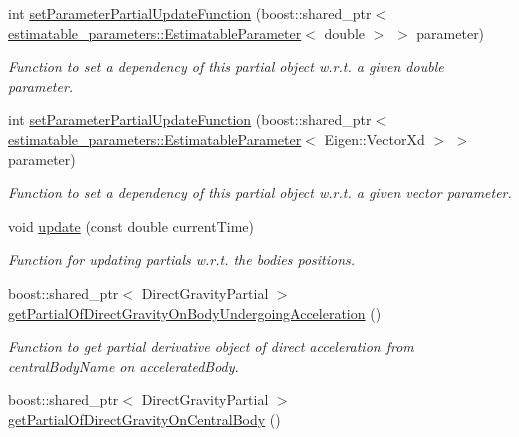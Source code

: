 \begin{DoxyCompactItemize}
int \hyperlink{classtudat_1_1acceleration__partials_1_1ThirdBodyGravityPartial_a06fe1d487449447bdb04053481e0fbcc}{set\+Parameter\+Partial\+Update\+Function} (boost\+::shared\+\_\+ptr$<$ \hyperlink{classtudat_1_1estimatable__parameters_1_1EstimatableParameter}{estimatable\+\_\+parameters\+::\+Estimatable\+Parameter}$<$ double $>$ $>$ parameter)
\begin{DoxyCompactList}\small\item\em Function to set a dependency of this partial object w.\+r.\+t. a given double parameter. \end{DoxyCompactList}\item 
int \hyperlink{classtudat_1_1acceleration__partials_1_1ThirdBodyGravityPartial_ae98c7bbf80bea9ecb8a72dc74604d5b9}{set\+Parameter\+Partial\+Update\+Function} (boost\+::shared\+\_\+ptr$<$ \hyperlink{classtudat_1_1estimatable__parameters_1_1EstimatableParameter}{estimatable\+\_\+parameters\+::\+Estimatable\+Parameter}$<$ Eigen\+::\+Vector\+Xd $>$ $>$ parameter)
\begin{DoxyCompactList}\small\item\em Function to set a dependency of this partial object w.\+r.\+t. a given vector parameter. \end{DoxyCompactList}\item 
void \hyperlink{classtudat_1_1acceleration__partials_1_1ThirdBodyGravityPartial_a466e34a3c5016283ca0d58b9b9408f36}{update} (const double current\+Time)
\begin{DoxyCompactList}\small\item\em Function for updating partials w.\+r.\+t. the bodies\textquotesingle{} positions. \end{DoxyCompactList}\item 
boost\+::shared\+\_\+ptr$<$ Direct\+Gravity\+Partial $>$ \hyperlink{classtudat_1_1acceleration__partials_1_1ThirdBodyGravityPartial_a1a09e82fe8cbe0ec2469d9442a080628}{get\+Partial\+Of\+Direct\+Gravity\+On\+Body\+Undergoing\+Acceleration} ()
\begin{DoxyCompactList}\small\item\em Function to get partial derivative object of direct acceleration from central\+Body\+Name on accelerated\+Body. \end{DoxyCompactList}\item 
boost\+::shared\+\_\+ptr$<$ Direct\+Gravity\+Partial $>$ \hyperlink{classtudat_1_1acceleration__partials_1_1ThirdBodyGravityPartial_aa3461bb3cd137a718e93a15746e2a5b7}{get\+Partial\+Of\+Direct\+Gravity\+On\+Central\+Body} ()

\end{DoxyCompactItemize}
